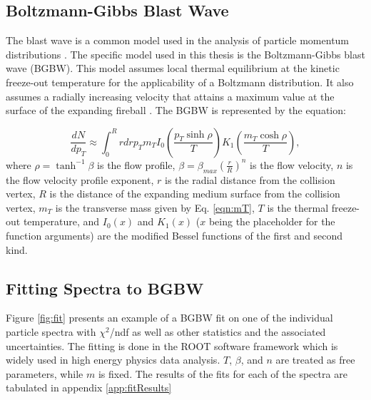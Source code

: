 \subsection{Boltzmann-Gibbs Blast Wave}
% 
The blast wave is a common model used in the analysis of particle momentum distributions \cite{Tang:2008ud,Tripathy:2017kwb,PhysRevC.96.044904}. The specific model used in this thesis is the Boltzmann-Gibbs blast wave (BGBW). This model assumes local thermal equilibrium at the kinetic freeze-out temperature for the applicability of a Boltzmann distribution. It also assumes a radially increasing velocity that attains a maximum value at the surface of the expanding fireball \cite{Tripathy:2017kwb}. The BGBW is represented by the equation: %

	\begin{equation}\label{eqn:BGBW}
	\frac{dN}{dp_{T}} \approx \int_{0}^{R} rdrp_{T}m_{T}I_{0}(\frac{p_{T}\sinh\rho}{T})K_{1}(\frac{m_{T}\cosh\rho}{T}),
	\end{equation}
where $\rho = \tanh^{-1}\beta$ is the flow profile, $\beta = \beta_{max}(\frac{r}{R})^{n}$ is the flow velocity, $n$ is the flow velocity profile exponent, $r$ is the radial distance from the collision vertex, $R$ is the distance of the expanding medium surface from the collision vertex, $m_{T}$ is the transverse mass given by Eq. \ref{eqn:mT}, $T$ is the thermal freeze-out temperature, and $I_{0}(x)$ and $K_{1}(x)$ ($x$ being the placeholder for the function arguments) are the modified Bessel functions of the first and second kind.



\subsection{Fitting Spectra to BGBW}
Figure \ref{fig:fit} presents an example of a BGBW fit on one of the individual particle spectra with $\chi^{2}$/ndf as well as other statistics and the associated uncertainties. The fitting is done in the ROOT software framework which is widely used in high energy physics data analysis. $T$, $\beta$, and $n$ are treated as free parameters, while $m$ is fixed. The results of the fits for each of the spectra are tabulated in appendix \ref{app:fitResults}

